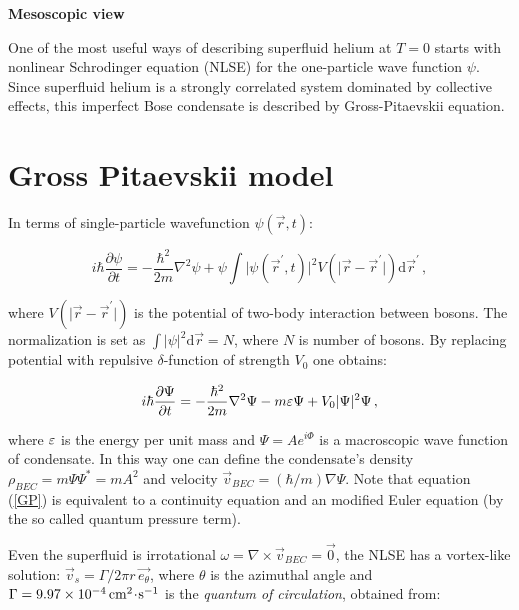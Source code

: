 {\Huge \bfseries Mesoscopic view}
\vspace{0.3cm}

One of the most useful ways of describing superfluid helium at $T=0$ starts with nonlinear Schrodinger equation (NLSE) for the one-particle wave function $\psi$. Since superfluid helium is a strongly correlated system dominated by collective effects, this imperfect Bose condensate is described by Gross-Pitaevskii equation.

\section{Gross Pitaevskii model}

In terms of single-particle wavefunction $\psi(\vec{r},t)$:

\begin{equation}
i \hbar \frac{\partial \psi}{\partial t} = - \frac{\hbar^2}{2m} \nabla^2 \psi
+ \psi \int \vert \psi(\vec{r}^{\prime},t) \vert^2 V(\vert \vec{r} - \vec{r}^{\prime} \vert)
\text{d}\vec{r}^{\prime}\,,
\end{equation}

where $V(\vert \vec{r} - \vec{r}^{\prime} \vert)$ is the potential of two-body interaction between bosons. The normalization is set as $\int \vert \psi \vert^2 \text{d}\vec{r} = N$, where $N$ is number of bosons. By replacing potential with repulsive $\delta$-function of strength $V_0$ one obtains:

\begin{equation}
i \hbar \frac{\partial \Psi}{\partial t} = - \frac{\hbar^2}{2m} \nabla^2 \Psi - m\varepsilon \Psi + V_0 \vert \Psi \vert^2 \Psi\,,
\label{GP}
\end{equation}

where $\varepsilon$ is the energy per unit mass and $\Psi = A e^{i\Phi}$ is a macroscopic wave function of condensate. In this way one can define the condensate's density $\rho_{BEC} = m\Psi\Psi^* =  mA^2$ and velocity $\vec{v}_{BEC} = (\hbar / m)\nabla \Psi$. Note that equation (\ref{GP}) is equivalent to a continuity equation and an modified Euler equation (by the so called quantum pressure term).

Even the superfluid is irrotational $\omega = \nabla \times \vec{v}_{BEC} = \vec{0}$, the NLSE has a vortex-like solution: $\vec{v}_s = \Gamma / 2\pi r\, \vec{e_{\theta}}$, where $\theta$ is the azimuthal angle and $\Gamma=9.97 \times 10^{-4} \,\mathrm{cm^2 \!\cdot\! s^{-1}}$ is the \textit{quantum of circulation}, obtained from:

